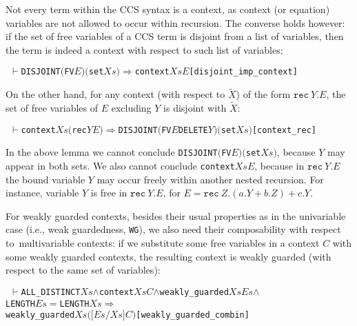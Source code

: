 \documentclass[GCNS]{yincog}
\renewcommand{\HOLinline}[1]{\mbox{\textup{\texttt{#1}}}}
\renewcommand{\HOLConst}[1]{\texttt{#1}}
\renewcommand{\HOLFreeVar}[1]{\ensuremath{\mathit{#1}}}
\renewcommand{\HOLSymConst}[1]{#1}
\renewcommand{\HOLTokenConj}{\ensuremath{\wedge}}
\renewcommand{\HOLTokenTurnstile}{\ensuremath{\:\:\vdash}}
\theoremstyle{remark}
\theoremstyle{theorem}
\theoremstyle{remark}
\renewcommand{\HOLTokenImp}{\ensuremath{\Longrightarrow}}
\newcommand{\univariate}{univariable\xspace}
\newcommand{\multivariate}{multivariable\xspace}
\renewcommand{\tilde}{\widetilde}
\newcommand{\recu}[2]{\mathtt{rec}\: #1 . #2}
\newcommand{\til}{\tilde}
\begin{document}
Not every term within the CCS syntax is a context, as context (or equation)
variables are not allowed to occur within recursion. The converse holds
however: if the set of free variables of a CCS term is disjoint from a
list of variables, then the term is indeed a context with respect to such
list of variables:
%
\begin{alltt}
\HOLTokenTurnstile{} \HOLConst{DISJOINT} \ensuremath{(}\HOLConst{FV} \HOLFreeVar{E}\ensuremath{)} \ensuremath{(}\HOLConst{set} \HOLFreeVar{Xs}\ensuremath{)} \HOLSymConst{\HOLTokenImp{}} \HOLConst{context} \HOLFreeVar{Xs} \HOLFreeVar{E}\hfill{[disjoint\_imp\_context]}
\end{alltt}
%
On the other hand, for any context (with respect to $\til X$) of the form
$\recu Y E$, the set of free variables of $E$ excluding $Y$ is disjoint
with $\til X$:
%
\begin{alltt}
\HOLTokenTurnstile{} \HOLConst{context} \HOLFreeVar{Xs} \ensuremath{(}\HOLConst{rec} \HOLFreeVar{Y} \HOLFreeVar{E}\ensuremath{)} \HOLSymConst{\HOLTokenImp{}} \HOLConst{DISJOINT} \ensuremath{(}\HOLConst{FV} \HOLFreeVar{E} \HOLConst{DELETE} \HOLFreeVar{Y}\ensuremath{)} \ensuremath{(}\HOLConst{set} \HOLFreeVar{Xs}\ensuremath{)}\hfill{[context\_rec]}
\end{alltt}
%
In the above lemma we cannot conclude
\HOLinline{\HOLConst{DISJOINT}\\\;\ensuremath{(}\HOLConst{FV}\\\;\HOLFreeVar{E}\ensuremath{)}\\\;\ensuremath{(}\HOLConst{set}\\\;\HOLFreeVar{Xs}\ensuremath{)}},
because $Y$ may appear in both sets. We also cannot conclude
\HOLinline{\HOLConst{context}\\\;\HOLFreeVar{Xs}\\\;\HOLFreeVar{E}}, because
in $\recu Y E$ the bound variable $Y$ may occur freely within another nested
recursion. For instance, variable $Y$ is free in $\recu Y E$, for
$E = \recu Z (a.Y + b.Z) + c.Y$.

For weakly guarded contexts, besides their usual properties as in the
\univariate case (i.e., weak guardedness, \HOLinline{\HOLConst{WG}}), we
also need their composability with respect to~\multivariate contexts: if
we substitute some free variables in a context $C$ with some weakly guarded
contexts, the resulting context is weakly guarded (with respect to the
same set of variables):
%
\begin{alltt}
\HOLTokenTurnstile{} \HOLConst{ALL\_DISTINCT} \HOLFreeVar{Xs} \HOLSymConst{\HOLTokenConj{}} \HOLConst{context} \HOLFreeVar{Xs} \HOLFreeVar{C} \HOLSymConst{\HOLTokenConj{}} \HOLConst{weakly\_guarded} \HOLFreeVar{Xs} \HOLFreeVar{Es} \HOLSymConst{\HOLTokenConj{}}
   \HOLConst{LENGTH} \HOLFreeVar{Es} \HOLSymConst{\ensuremath{=}} \HOLConst{LENGTH} \HOLFreeVar{Xs} \HOLSymConst{\HOLTokenImp{}}
   \HOLConst{weakly\_guarded} \HOLFreeVar{Xs} \ensuremath{(}\ensuremath{[}\HOLFreeVar{Es}\ensuremath{/}\HOLFreeVar{Xs}\ensuremath{]} \HOLFreeVar{C}\ensuremath{)}\hfill{[weakly\_guarded\_combin]}
\end{alltt}
\end{document}
